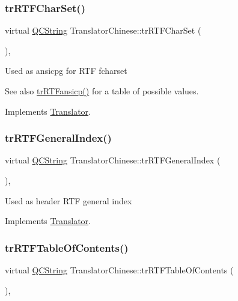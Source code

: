 \subsubsection{\texorpdfstring{trRTFCharSet()}{trRTFCharSet()}}
{\footnotesize\ttfamily virtual \mbox{\hyperlink{class_q_c_string}{Q\+C\+String}} Translator\+Chinese\+::tr\+R\+T\+F\+Char\+Set (\begin{DoxyParamCaption}{ }\end{DoxyParamCaption})\hspace{0.3cm}{\ttfamily [inline]}, {\ttfamily [virtual]}}

Used as ansicpg for R\+TF fcharset \begin{DoxySeeAlso}{See also}
\mbox{\hyperlink{class_translator_chinese_a4f6b051cede382e7d4234506aeaccedb}{tr\+R\+T\+Fansicp()}} for a table of possible values. 
\end{DoxySeeAlso}


Implements \mbox{\hyperlink{class_translator_afad391f3cbfb5ce6332b7239f8e2049a}{Translator}}.

\mbox{\label{class_translator_chinese_a7968e2923b5eaf5786248fc3839f516d}} 
\subsubsection{\texorpdfstring{trRTFGeneralIndex()}{trRTFGeneralIndex()}}
{\footnotesize\ttfamily virtual \mbox{\hyperlink{class_q_c_string}{Q\+C\+String}} Translator\+Chinese\+::tr\+R\+T\+F\+General\+Index (\begin{DoxyParamCaption}{ }\end{DoxyParamCaption})\hspace{0.3cm}{\ttfamily [inline]}, {\ttfamily [virtual]}}

Used as header R\+TF general index 

Implements \mbox{\hyperlink{class_translator}{Translator}}.

\mbox{\label{class_translator_chinese_ac3028992d039e52e73e60bf63455dadb}} 
\subsubsection{\texorpdfstring{trRTFTableOfContents()}{trRTFTableOfContents()}}
{\footnotesize\ttfamily virtual \mbox{\hyperlink{class_q_c_string}{Q\+C\+String}} Translator\+Chinese\+::tr\+R\+T\+F\+Table\+Of\+Contents (\begin{DoxyParamCaption}{ }\end{DoxyParamCaption})\hspace{0.3cm}{\ttfamily [inline]}, {\ttfamily [virtual]}}

